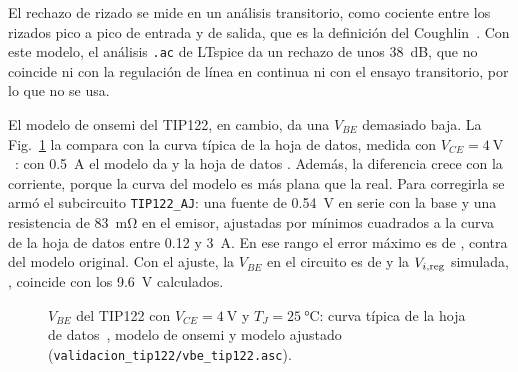 El rechazo de rizado se mide en un análisis transitorio, como cociente entre los rizados pico a pico de entrada y de salida, que es la definición del Coughlin~\cite[Sec.~15-8.5]{coughlin}. Con este modelo, el análisis \texttt{.ac} de LTspice da un rechazo de unos \SI{38}{\deci\bel}, que no coincide ni con la regulación de línea en continua ni con el ensayo transitorio, por lo que no se usa.

El modelo de onsemi del TIP122, en cambio, da una $V_{BE}$ demasiado baja. La Fig.~\ref{fig:vbe} la compara con la curva típica de la hoja de datos, medida con $V_{CE} = \SI{4}{\volt}$~\cite[Fig.~11]{tip120}: con \SI{0,5}{\ampere} el modelo da  y la hoja de datos . Además, la diferencia crece con la corriente, porque la curva del modelo es más plana que la real. Para corregirla se armó el subcircuito \texttt{TIP122\_AJ}: una fuente de \SI{0,54}{\volt} en serie con la base y una resistencia de \SI{83}{\milli\ohm} en el emisor, ajustadas por mínimos cuadrados a la curva de la hoja de datos entre \SI{0,12}{} y \SI{3}{\ampere}. En ese rango el error máximo es de , contra  del modelo original. Con el ajuste, la $V_{BE}$ en el circuito es de  y la $V_{i,\mathrm{reg}}$ simulada, , coincide con los \SI{9,6}{\volt} calculados.

\begin{figure}[!htb]
\centering
{}
\caption{$V_{BE}$ del TIP122 con $V_{CE} = \SI{4}{\volt}$ y $T_J = \SI{25}{\celsius}$: curva típica de la hoja de datos~\cite[Fig.~11]{tip120}, modelo de onsemi y modelo ajustado (\texttt{validacion\_tip122/vbe\_tip122.asc}).}
\label{fig:vbe}
\end{figure}

